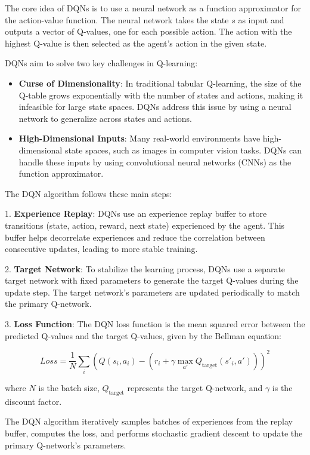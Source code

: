 The core idea of DQNs is to use a neural network as a function approximator for the action-value function. The neural network takes the state \(s\) as input and outputs a vector of Q-values, one for each possible action. The action with the highest Q-value is then selected as the agent's action in the given state.

DQNs aim to solve two key challenges in Q-learning:
\begin{itemize}
    \item \textbf{Curse of Dimensionality}: In traditional tabular Q-learning, the size of the Q-table grows exponentially with the number of states and actions, making it infeasible for large state spaces. DQNs address this issue by using a neural network to generalize across states and actions.
    \item \textbf{High-Dimensional Inputs}: Many real-world environments have high-dimensional state spaces, such as images in computer vision tasks. DQNs can handle these inputs by using convolutional neural networks (CNNs) as the function approximator.
\end{itemize}

The DQN algorithm follows these main steps:

1.
\textbf{Experience Replay}: DQNs use an experience replay buffer to store transitions (state, action, reward, next state) experienced by the agent. This buffer helps decorrelate experiences and reduce the correlation between consecutive updates, leading to more stable training.

2.
\textbf{Target Network}: To stabilize the learning process, DQNs use a separate target network with fixed parameters to generate the target Q-values during the update step. The target network's parameters are updated periodically to match the primary Q-network.

3.
\textbf{Loss Function}: The DQN loss function is the mean squared error between the predicted Q-values and the target Q-values, given by the Bellman equation:

\[Loss = \frac{1}{N} \sum_{i}(Q(s_i, a_i) - (r_i + \gamma \max_{a'}Q_{\text{target}}(s'_i, a')))^2\]

where \(N\) is the batch size, \(Q_{\text{target}}\) represents the target Q-network, and \(\gamma\) is the discount factor.

The DQN algorithm iteratively samples batches of experiences from the replay buffer, computes the loss, and performs stochastic gradient descent to update the primary Q-network's parameters.

